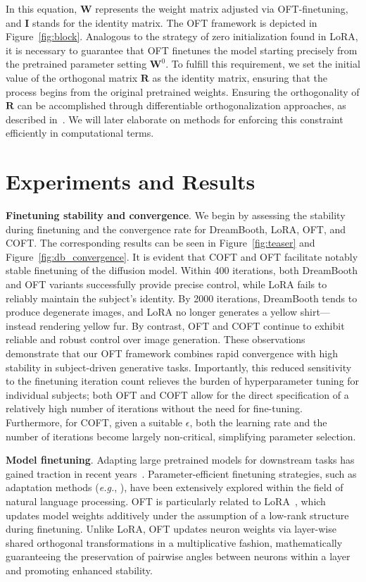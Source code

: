 In this equation, $\bm{W}$ represents the weight matrix adjusted via OFT-finetuning, and $\bm{I}$ stands for the identity matrix. The OFT framework is depicted in Figure~\ref{fig:block}. Analogous to the strategy of zero initialization found in LoRA, it is necessary to guarantee that OFT finetunes the model starting precisely from the pretrained parameter setting $\bm{W}^0$. To fulfill this requirement, we set the initial value of the orthogonal matrix $\bm{R}$ as the identity matrix, ensuring that the process begins from the original pretrained weights. Ensuring the orthogonality of $\bm{R}$ can be accomplished through differentiable orthogonalization approaches, as described in~\cite{liu2021orthogonal,lezcano2019cheap}. We will later elaborate on methods for enforcing this constraint efficiently in computational terms.

\section{Experiments and Results}

\textbf{Finetuning stability and convergence}. We begin by assessing the stability during finetuning and the convergence rate for DreamBooth, LoRA, OFT, and COFT. The corresponding results can be seen in Figure~\ref{fig:teaser} and Figure~\ref{fig:db_convergence}. It is evident that COFT and OFT facilitate notably stable finetuning of the diffusion model. Within 400 iterations, both DreamBooth and OFT variants successfully provide precise control, while LoRA fails to reliably maintain the subject’s identity. By 2000 iterations, DreamBooth tends to produce degenerate images, and LoRA no longer generates a yellow shirt—instead rendering yellow fur. By contrast, OFT and COFT continue to exhibit reliable and robust control over image generation. These observations demonstrate that our OFT framework combines rapid convergence with high stability in subject-driven generative tasks. Importantly, this reduced sensitivity to the finetuning iteration count relieves the burden of hyperparameter tuning for individual subjects; both OFT and COFT allow for the direct specification of a relatively high number of iterations without the need for fine-tuning. Furthermore, for COFT, given a suitable $\epsilon$, both the learning rate and the number of iterations become largely non-critical, simplifying parameter selection.

\textbf{Model finetuning}. Adapting large pretrained models for downstream tasks has gained traction in recent years~\cite{devlin2018bert,brown2020language,he2022masked}. Parameter-efficient finetuning strategies, such as adaptation methods (\emph{e.g.}, \cite{hulora2022,houlsby2019parameter,pfeiffer2020adapterfusion}), have been extensively explored within the field of natural language processing. OFT is particularly related to LoRA~\cite{hulora2022}, which updates model weights additively under the assumption of a low-rank structure during finetuning. Unlike LoRA, OFT updates neuron weights via layer-wise shared orthogonal transformations in a multiplicative fashion, mathematically guaranteeing the preservation of pairwise angles between neurons within a layer and promoting enhanced stability.

